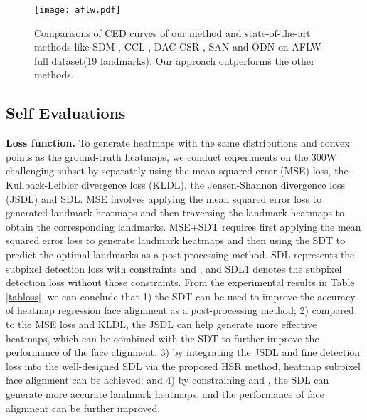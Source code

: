 \documentclass[journal]{IEEEtran}
\begin{document}
\begin{figure}[t]
	\begin{center}
		\texttt{[image: aflw.pdf]}
	\end{center}
	\caption{Comparisons of CED curves of our method and state-of-the-art methods like SDM \cite{xiong2013supervised}, CCL \cite{Zhu2016UnconstrainedFA}, DAC-CSR \cite{Feng2017DynamicAC}, SAN \cite{Dong2018StyleAN} and ODN \cite{Zhu2019RobustFL} on AFLW-full dataset(19 landmarks). Our approach outperforms the other methods.}
	\label{figaflw}
\end{figure}
\subsection{Self Evaluations}
\textbf{Loss function.} To generate heatmaps with the same distributions and convex points as the ground-truth heatmaps, we conduct experiments on the 300W challenging subset by separately using the mean squared error (MSE) loss, the Kullback-Leibler divergence loss (KLDL), the Jensen-Shannon divergence loss (JSDL) and SDL. MSE involves applying the mean squared error loss to generated landmark heatmaps and then traversing the landmark heatmaps to obtain the corresponding landmarks. MSE+SDT requires first applying the mean squared error loss to generate landmark heatmaps and then using the SDT to predict the optimal landmarks as a post-processing method. SDL represents the subpixel detection loss with constraints  and , and SDL1 denotes the subpixel detection loss without those constraints. From the experimental results in Table \ref{tabloss}, we can conclude that 1) the SDT can be used to improve the accuracy of heatmap regression face alignment as a post-processing method; 2) compared to the MSE loss and KLDL, the JSDL can help generate more effective heatmaps, which can be combined with the SDT to further improve the performance of the face alignment. 3) by integrating the JSDL and fine detection loss into the well-designed SDL via the proposed HSR method, heatmap subpixel face alignment can be achieved; and 4) by constraining  and , the SDL can generate more accurate landmark heatmaps, and the performance of face alignment can be further improved.
\end{document}
